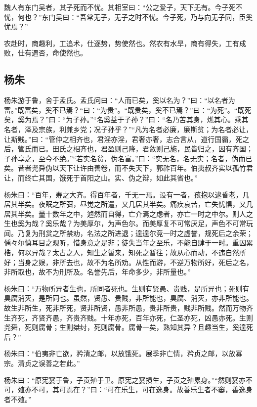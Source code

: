\documentclass[]{article}
\begin{document}
魏人有东门吴者，其子死而不忧。其相室曰：``公之爱子，天下无有。今子死不忧，何也？''东门吴曰：``吾常无子，无子之时不忧。今子死，乃与向无子同，臣奚忧焉？''

农赴时，商趣利，工追术，仕逐势，势使然也。然农有水旱，商有得失，工有成败，仕有遇否，命使然也。

\hypertarget{header-n113}{%
\subsection{杨朱}\label{header-n113}}

杨朱游于鲁，舍于孟氏。孟氏问曰：``人而已矣，奚以名为？''曰：``以名者为富。''既富矣，奚不已焉？``曰：``为贵''。``既贵矣，奚不已焉？''曰：``为死''。``既死矣，奚为焉？''曰：``为子孙。''``名奚益于子孙？''曰：``名乃苦其身，燋其心。乘其名者，泽及宗族，利兼乡党；况子孙乎？''``凡为名者必廉，廉斯贫；为名者必让，让斯贱。''曰：``管仲之相齐也，君淫亦淫，君奢亦奢，志合言从，道行国霸，死之后，管氏而已。田氏之相齐也，君盈则己降，君敛则己施，民皆归之，因有齐国；子孙享之，至今不绝。''``若实名贫，伪名富。''曰：``实无名，名无实；名者，伪而已矣。昔者尧舜伪以天下让许由善卷，而不失天下，郭祚百年。伯夷叔齐实以孤竹君让，而终亡其国，饿死于首阳之山。实、伪之辩，如此其省也。''

杨朱曰：``百年，寿之大齐。得百年者，千无一焉。设有一者，孩抱以逮昏老，几居其半矣。夜眠之所弭，昼觉之所遣，又几居其半矣。痛疾哀苦，亡失忧惧，又几居其半矣。量十数年之中，逌然而自得，亡介焉之虑者，亦亡一时之中尔。则人之生也奚为哉？奚乐哉？为美厚尔，为声色尔。而美厚复不可常厌足，声色不可常玩闻。乃复为刑赏之所禁劝，名法之所进退；遑遑尔竞一时之虚誉，规死后之余荣；偊々尔慎耳目之观听，惜身意之是非；徒失当年之至乐，不能自肆于一时。重囚累梏，何以异哉？太古之人，知生之暂来，知死之暂往；故从心而动，不违自然所好；当身之娱，非所去也，故不为名所劝。从性而游，不逆万物所好，死后之名，非所取也，故不为刑所及。名誉先后，年命多少，非所量也。''

杨朱曰：``万物所异者生也，所同者死也。生则有贤愚、贵贱，是所异也；死则有臭腐消灭，是所同也。虽然，贤愚、贵贱，非所能也，臭腐、消灭，亦非所能也。故生非所生，死非所死，贤非所贤，愚非所愚，贵非所贵，贱非所贱。然而万物齐生齐死，齐贤齐愚，齐贵齐贱。十年亦死，百年亦死，仁圣亦死，凶愚亦死。生则尧舜，死则腐骨；生则桀纣，死则腐骨。腐骨一矣，熟知其异？且趣当生，奚遑死后？''

杨朱曰：``伯夷非亡欲，矜清之邮，以放饿死。展季非亡情，矜贞之邮，以放寡宗。清贞之误善之若此。''

杨朱曰：``原宪窭于鲁，子贡殖于卫。原宪之窭损生，子贡之殖累身。''``然则窭亦不可，殖亦不可，其可焉在？''曰：``可在乐生，可在逸身。故善乐生者不窭，善逸身者不殖。''
\end{document}
